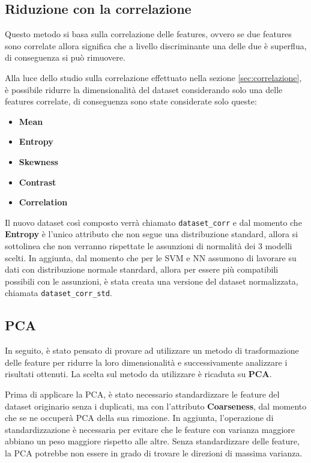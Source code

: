 \subsection{Riduzione con la correlazione} \label{sec:riduzione_correlazione}
Questo metodo si basa sulla correlazione delle features, ovvero se due features
sono correlate allora significa che a livello discriminante una delle due è
superflua, di conseguenza si può rimuovere.

Alla luce dello studio sulla correlazione effettuato nella sezione \ref{sec:correlazione},
è possibile ridurre la dimensionalità del dataset considerando solo una delle
features correlate, di conseguenza sono state considerate solo queste:
\begin{itemize}
      \item \textbf{Mean}
      \item \textbf{Entropy}
      \item \textbf{Skewness}
      \item \textbf{Contrast}
      \item \textbf{Correlation}
\end{itemize}
Il nuovo dataset così composto verrà chiamato \texttt{dataset\_corr} e dal momento
che \textbf{Entropy} è l'unico attributo che non segue una distribuzione standard,
allora si sottolinea che non verranno rispettate le assunzioni di normalità dei
$3$ modelli scelti. In aggiunta, dal momento che per le SVM e NN assumono di
lavorare su dati con distribuzione normale stanrdard, allora per essere più
compatibili possibili con le assunzioni, è stata creata una versione del dataset
normalizzata, chiamata \texttt{dataset\_corr\_std}.
\subsection{PCA} \label{sec:pca}
In seguito, è stato pensato di provare ad utilizzare un metodo di trasformazione
delle feature per ridurre la loro dimensionalità e successivamente analizzare i
risultati ottenuti. La scelta sul metodo da utilizzare è ricaduta su \textbf{PCA}.

Prima di applicare la PCA, è stato necessario standardizzare le feature del dataset
originario senza i duplicati, ma con l'attributo \textbf{Coarseness}, dal momento
che se ne occuperà PCA della sua rimozione. In aggiunta, l'operazione di
standardizzazione è necessaria per evitare che le feature con varianza maggiore
abbiano un peso maggiore rispetto alle altre. Senza standardizzare delle feature,
la PCA potrebbe non essere in grado di trovare le direzioni di massima varianza.

